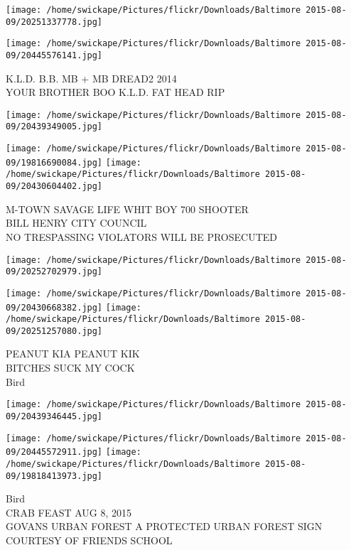 \documentclass[10pt,letterpaper]{article}
\begin{document}
\texttt{[image: /home/swickape/Pictures/flickr/Downloads/Baltimore 2015-08-09/20251337778.jpg]}

\vspace{0.25in}
\texttt{[image: /home/swickape/Pictures/flickr/Downloads/Baltimore 2015-08-09/20445576141.jpg]}

K.L.D. B.B. MB + MB DREAD2 2014\\
YOUR BROTHER BOO K.L.D. FAT HEAD RIP\\
\pagebreak

\texttt{[image: /home/swickape/Pictures/flickr/Downloads/Baltimore 2015-08-09/20439349005.jpg]}

\vspace{0.25in}
\texttt{[image: /home/swickape/Pictures/flickr/Downloads/Baltimore 2015-08-09/19816690084.jpg]}
\texttt{[image: /home/swickape/Pictures/flickr/Downloads/Baltimore 2015-08-09/20430604402.jpg]}

M{-}TOWN SAVAGE LIFE WHIT BOY 700 SHOOTER\\
BILL HENRY CITY COUNCIL\\
NO TRESPASSING VIOLATORS WILL BE PROSECUTED\\
\pagebreak

\texttt{[image: /home/swickape/Pictures/flickr/Downloads/Baltimore 2015-08-09/20252702979.jpg]}

\vspace{0.25in}
\texttt{[image: /home/swickape/Pictures/flickr/Downloads/Baltimore 2015-08-09/20430668382.jpg]}
\texttt{[image: /home/swickape/Pictures/flickr/Downloads/Baltimore 2015-08-09/20251257080.jpg]}

PEANUT KIA PEANUT KIK\\
BITCHES SUCK MY COCK\\
Bird\\
\pagebreak

\texttt{[image: /home/swickape/Pictures/flickr/Downloads/Baltimore 2015-08-09/20439346445.jpg]}

\vspace{0.25in}
\texttt{[image: /home/swickape/Pictures/flickr/Downloads/Baltimore 2015-08-09/20445572911.jpg]}
\texttt{[image: /home/swickape/Pictures/flickr/Downloads/Baltimore 2015-08-09/19818413973.jpg]}

Bird\\
CRAB FEAST AUG 8, 2015\\
GOVANS URBAN FOREST A PROTECTED URBAN FOREST SIGN COURTESY OF FRIENDS SCHOOL\\
\pagebreak
\end{document}
